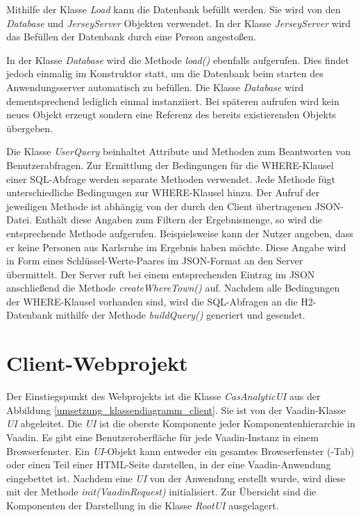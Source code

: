 Mithilfe der Klasse \textit{Load} kann die Datenbank befüllt werden. Sie wird von den \textit{Database} und \textit{JerseyServer} Objekten verwendet. In der Klasse \textit{JerseyServer} wird das Befüllen der Datenbank durch eine Person angestoßen.

In der Klasse \textit{Database} wird die Methode \textit{load()} ebenfalls aufgerufen. Dies findet jedoch einmalig im Konstruktor statt, um die Datenbank beim starten des Anwendungsserver automatisch zu befüllen. Die Klasse \textit{Database} wird dementsprechend lediglich einmal instanziiert. Bei späteren aufrufen wird kein neues Objekt erzeugt sondern eine Referenz des bereits existierenden Objekts übergeben.

Die Klasse \textit{UserQuery} beinhaltet Attribute und Methoden zum Beantworten von Benutzerabfragen. Zur Ermittlung der Bedingungen für die WHERE-Klausel einer SQL-Abfrage werden separate Methoden verwendet. Jede Methode fügt unterschiedliche Bedingungen zur WHERE-Klausel hinzu. Der Aufruf der jeweiligen Methode ist abhängig von der durch den Client übertragenen JSON-Datei. Enthält diese Angaben zum Filtern der Ergebnismenge, so wird die entsprechende Methode aufgerufen. Beispielsweise kann der Nutzer angeben, dass er keine Personen aus Karlsruhe im Ergebnis haben möchte. Diese Angabe wird in Form eines Schlüssel-Werte-Paares im JSON-Format an den Server übermittelt. Der Server ruft bei einem entsprechenden Eintrag im JSON anschließend die Methode \textit{createWhereTown()} auf. Nachdem alle Bedingungen der WHERE-Klausel vorhanden sind, wird die SQL-Abfragen an die H2-Datenbank mithilfe der Methode \textit{buildQuery()} generiert und gesendet. 

\section{Client-Webprojekt}
\label{ch:Umsetzung:sec:clientwar}

Der Einstiegspunkt des Webprojekts ist die Klasse \textit{CasAnalyticUI} aus der Abbildung \ref{umsetzung_klassendiagramm_client}. Sie ist von der Vaadin-Klasse \textit{UI} abgeleitet. Die \textit{UI} ist die oberste Komponente jeder Komponentenhierarchie in Vaadin. Es gibt eine Benutzeroberfläche für jede Vaadin-Instanz in einem Browserfenster. Ein \textit{UI}-Objekt kann entweder ein gesamtes Browserfenster (-Tab) oder einen Teil einer HTML-Seite darstellen, in der eine Vaadin-Anwendung eingebettet ist. Nachdem eine \textit{UI} von der Anwendung erstellt wurde, wird diese mit der Methode \textit{init(VaadinRequest)} initialisiert. Zur Übersicht sind die Komponenten der Darstellung in die Klasse \textit{RootUI} ausgelagert. 


